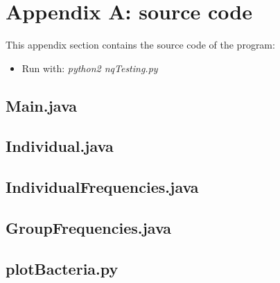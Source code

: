 \documentclass[runningheads]{llncs}
\begin{document}
\section{Appendix A: source code}\label{appendix}
This appendix section contains the source code of the program:
\begin{itemize}
\item Run with: \textit{python2 nqTesting.py}
\end{itemize}

\subsection{Main.java}\label{main}


\subsection{Individual.java}\label{ind}


\subsection{IndividualFrequencies.java}\label{indfre}


\subsection{GroupFrequencies.java}\label{groupfre}


\subsection{plotBacteria.py}\label{plot1}


%
\end{document}
